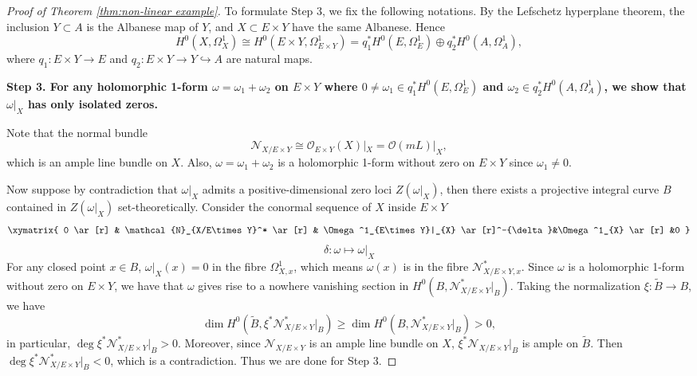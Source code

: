 \documentclass[a4paper,12pt,reqno]{amsart}
\theoremstyle{question}
\theoremstyle{definition}
\theoremstyle{remark}
\theoremstyle{cited}
\theoremstyle{citeddef}
\def\PP{{\mathbb P}}
\def\cA{\mathcal{A}}
\def\cO{\mathcal{O}}
\def\cE{\mathcal{E}}
\def\cN{\mathcal{N}}
\begin{document}
\begin{proof}[Proof of Theorem \ref{thm:non-linear example}]

To formulate Step 3, we fix the following notations. By the Lefschetz hyperplane theorem, the inclusion $Y\subset A$ is the Albanese map of $Y$, and $X\subset E\times Y$ have the same Albanese. Hence $$H^0(X, \Omega_X^1)\cong H^0(E\times Y, \Omega_{E\times Y}^1)= q_1^*H^0(E, \Omega_E^1)\oplus q_2^*H^0(A, \Omega_A^1),$$ where $q_1\colon E\times Y\to E$ and $q_2\colon E\times Y\to Y\hookrightarrow A$ are natural maps.  


\textbf{Step 3. For any holomorphic 1-form $\omega=\omega_1+\omega_2$ on $E\times Y$  where $0\neq\omega_1\in q_1^*H^0(E, \Omega_E^1)$ and $\omega_2\in q_2^*H^0(A, \Omega_A^1)$, we show that $\omega|_X$ has only isolated zeros.}

Note that the normal bundle $$\cN_{X/E\times Y}\cong \cO_{E\times Y}(X)|_X=\cO(mL)|_X,$$ which is an ample line bundle on $X$. Also, $\omega=\omega_1+\omega_2$ is a holomorphic 1-form without zero on $E\times Y$ since $\omega_1\neq 0$.

Now suppose by contradiction that $\omega|_X$ admits a positive-dimensional zero loci $Z(\omega|_X)$, then there exists a projective integral curve $B$ contained in $Z(\omega|_X)$ set-theoretically. Consider the conormal sequence of $X$ inside $E\times Y$ 
	$$
\xymatrix{
	0 \ar[r] & \cN_{X/E\times Y}^* \ar[r] & \Omega^1_{E\times Y}|_{X} \ar[r]^-{\delta}&\Omega^1_{X} \ar[r] &0
}
$$ \[\delta\colon \omega\mapsto \omega|_X\] For any closed point $x\in B$, $\omega|_X(x)=0$ in the fibre $\Omega_{X,x}^1$, which means $\omega(x)$ is in the fibre $\cN_{X/E\times Y,x}^*$. Since $\omega$ is a holomorphic 1-form without zero on $E\times Y$, we have that $\omega$ gives rise to a nowhere vanishing section in $H^0(B, \cN_{X/E\times Y}^*|_{B})$. Taking the normalization $\xi\colon \widetilde{B}\to B$, we have $$\dim H^0(\widetilde{B}, \xi^*\cN_{X/E\times Y}^*|_{B})\geq \dim H^0(B, \cN_{X/E\times Y}^*|_{B})>0,$$
in particular, $\deg \xi^*\cN_{X/E\times Y}^*|_{B}>0$. Moreover, since $\cN_{X/E\times Y}$ is  an ample line bundle on $X$, $\xi^*\cN_{X/E\times Y}|_{B}$ is ample on $\widetilde{B}$. Then $\deg \xi^*\cN_{X/E\times Y}^*|_{B}<0$, which is a contradiction. Thus we are done for Step 3.
\vspace{0.5cm}


\end{proof}
\end{document}
